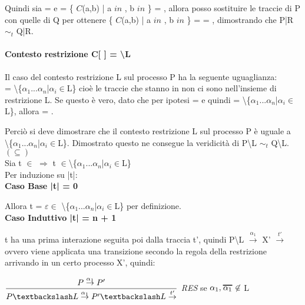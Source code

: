 Quindi sia  =  e  = \{ $C$(a,b) | a $in$ , b $in$ \} = , allora posso sostituire le traccie di P con quelle di Q per ottenere \{ $C$(a,b) | a $in$ , b $in$ \} =  = , dimostrando che P|R $\sim_{t}$ Q|R.

\paragraph{Contesto restrizione  C[ ] = \textbackslash L} \mbox{}

Il caso del contesto restrizione L sul processo P ha la seguente uguaglianza:\\  = \textbackslash\{$\alpha_{1}$...$\alpha_{n}$|$\alpha_{i}\in$L\} cioè le traccie che stanno in  non ci sono nell'insieme di restrizione L. Se questo è vero, dato che per ipotesi  =  e quindi  = \textbackslash \{$\alpha_{1}$...$\alpha_{n}$|$\alpha_{i}\in$L\}, allora  = . 

Perciò si deve dimostrare che il contesto restrizione L sul processo P è uguale a \\
\textbackslash \{$\alpha_{1}$...$\alpha_{n}$|$\alpha_{i}\in$L\}. Dimostrato questo ne consegue la veridicità di P\textbackslash L $\sim_{t}$ Q\textbackslash L.\\

$(\subseteq)$ \\

Sia t $\in$  $\Rightarrow$  t $\in$\textbackslash\{$\alpha_{1}$...$\alpha_{n}$|$\alpha_{i}\in$L\}\\
Per induzione su |t|:
\\

\textbf{Caso Base |t| = 0}

Allora t = $\varepsilon \in$ \textbackslash\{$\alpha_{1}$...$\alpha_{n}$|$\alpha_{i}\in$L\} per definizione.
\\

\textbf{Caso Induttivo |t| = n + 1}

t ha una prima interazione seguita poi dalla traccia t', quindi P\textbackslash L $ \overset{\alpha_{1}}\rightarrow $ X' $\overset{t'}\rightarrow$ ovvero viene applicata una transizione secondo la regola della restrizione arrivando in un certo processo X', quindi:
	
	$\dfrac{P \overset{\alpha_{1}}\rightarrow P'}{P\textbackslash L \overset{\alpha_{1}}\rightarrow P'\textbackslash L\overset{t'}\rightarrow}$ \textit{RES} se $\alpha_{1}, \Overline[1pt]{\alpha_{1}} \not\in$ L\\
	
